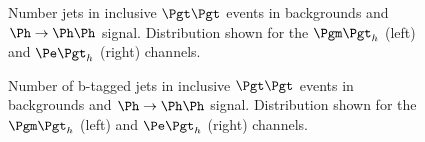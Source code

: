 \begin{figure}
\begin{center}

\end{center}
\caption{
Number jets in inclusive $\Pgt\Pgt$ events in backgrounds and
$\Ph\to\Ph\Ph$ signal. Distribution shown for the $\mutau$ (left) and $\etau$
(right) channels. }
\label{fig:Hhhbjets}
\end{figure} 

\begin{figure}
\begin{center}

\end{center}
\caption{
Number of b-tagged jets in inclusive $\Pgt\Pgt$ events in backgrounds and
$\Ph\to\Ph\Ph$ signal. Distribution shown for the $\mutau$ (left) and $\etau$
(right) channels. }
\label{fig:Hhhnbjets}
\end{figure} 


